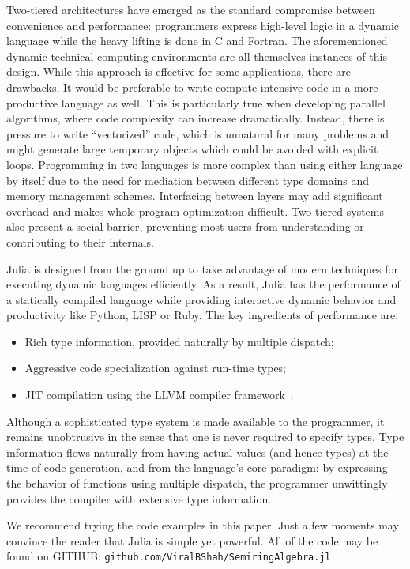 \documentclass[conference]{IEEEtran}
\begin{document}
Two-tiered architectures have emerged as the standard compromise between
convenience and performance: programmers express high-level logic in a
dynamic language while the heavy lifting is done in C and Fortran. The
aforementioned dynamic technical computing environments are all themselves
instances of this design. While this approach is effective for some
applications, there are drawbacks. It would be preferable to write
compute-intensive code in a more productive language as well. This is
particularly true when developing parallel algorithms, where code
complexity can increase dramatically. Instead, there is pressure to write
``vectorized'' code, which is unnatural for many problems and might
generate large temporary objects which could be avoided with explicit
loops. Programming in two languages is more complex than using either
language by itself due to the need for mediation between different type
domains and memory management schemes. Interfacing between layers may add
significant overhead and makes whole-program optimization difficult.
Two-tiered systems also present a social barrier, preventing most users
from understanding or contributing to their internals.

Julia is designed from the ground up to take advantage of modern
techniques for executing dynamic languages efficiently. As a result, Julia
has the performance of a statically compiled language while providing
interactive dynamic behavior and productivity like Python, LISP or Ruby.
The key ingredients of performance are:
\begin{itemize}
\item Rich type information, provided naturally by multiple dispatch;
\item Aggressive code specialization against run-time types;
\item JIT compilation using the LLVM compiler framework~\cite{LLVM}.
\end{itemize}
Although a sophisticated type system is made available to the programmer,
it remains unobtrusive in the sense that one is never required to specify
types. Type information flows naturally from having actual values (and
hence types) at the time of code generation, and from the language's core
paradigm: by expressing the behavior of functions using multiple dispatch,
the programmer unwittingly provides the compiler with extensive type
information.

We recommend trying the code examples in this paper.  Just a few moments may
convince the reader that Julia is simple yet powerful.
All of the code may be found on GITHUB:
\verb+github.com/ViralBShah/SemiringAlgebra.jl+
\end{document}
